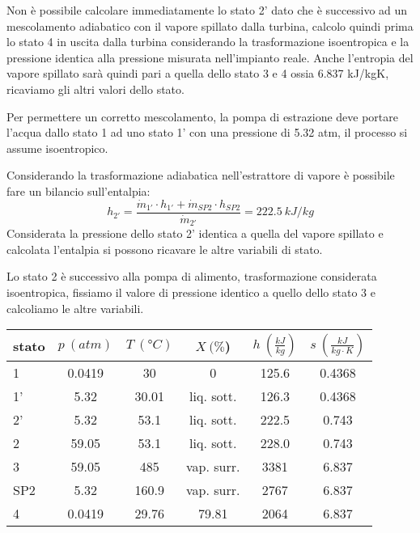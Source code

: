Non è possibile calcolare immediatamente lo stato 2' dato che è successivo ad un mescolamento adiabatico con il vapore spillato dalla turbina, calcolo quindi prima
lo stato 4 in uscita dalla turbina considerando la trasformazione isoentropica e la pressione identica alla pressione misurata nell'impianto reale.
Anche l'entropia del vapore spillato sarà quindi pari a quella dello stato 3 e 4 ossia 6.837 kJ/kgK, ricaviamo gli altri valori dello stato.

Per permettere un corretto mescolamento, la pompa di estrazione deve portare l'acqua dallo stato 1 ad uno stato 1' con una pressione di 5.32 atm, il processo si assume
isoentropico.

Considerando la trasformazione adiabatica nell'estrattore di vapore è possibile fare un bilancio sull'entalpia:
\begin{equation*}
    h_{2'} = \frac{\dot m_{1'}\cdot h_{1'} + \dot m_{SP2} \cdot h_{SP2}}{\dot m_{2'}} = 222.5\ kJ/kg
\end{equation*}
Considerata la pressione dello stato 2' identica a quella del vapore spillato e calcolata l'entalpia si possono ricavare le altre variabili di stato.

Lo stato 2 è successivo alla pompa di alimento, trasformazione considerata isoentropica, fissiamo il valore di pressione identico a quello dello stato 3 e calcoliamo
le altre variabili.
\begin{center}
    \begin{tabular}{l|c|c|c|c|c}
        stato    & $p\ (atm)$ & $T\ (\text{°}C) $&$X\ (\%$)& $h\ (\frac{kJ}{kg})$  & $s\ (\frac{kJ}{kg\cdot K})$\\ \hline
        1   &        0.0419 &            30   &    0      & 125.6    &0.4368 \\ \hline     %
        1'  &        5.32    &           30.01   &liq. sott.  & 126.3&0.4368 \\ \hline      %
        2'   &       5.32    &           53.1&liq. sott.& 222.5    &0.743 \\ \hline         %
        2   &        59.05   &           53.1&liq. sott.&  228.0   &0.743   \\ \hline       %
        3   &        59.05   &           485  & vap. surr.& 3381     &6.837  \\ \hline  %
        SP2  &       5.32        &       160.9 &  vap. surr.&2767     &6.837  \\ \hline  %
        4   &        0.0419       &      29.76&     79.81 & 2064     &6.837                 %
    \end{tabular}
\end{center}

